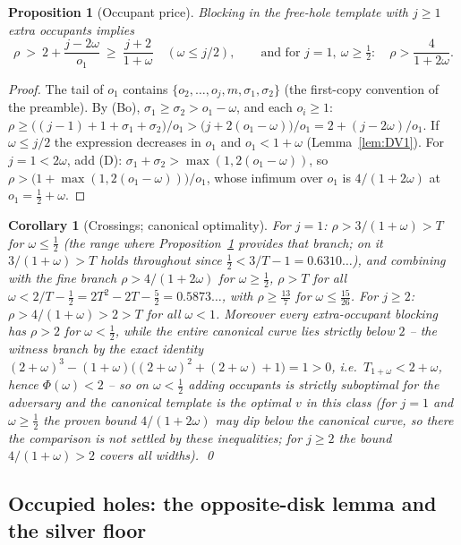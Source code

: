 \documentclass[11pt]{article}
\newtheorem{proposition}[theorem]{Proposition}
\newtheorem{corollary}[theorem]{Corollary}
\theoremstyle{definition}
\begin{document}
\begin{proposition}[Occupant price]\label{prop:DV2}
Blocking in the free-hole template with $j\ge1$ extra occupants implies
\[
\rho\ >\ 2+\frac{j-2\omega}{o_1}\ \ge\ \frac{j+2}{1+\omega}
\quad(\omega\le j/2),
\qquad\text{and for }j=1,\ \omega\ge\tfrac12:\quad
\rho>\frac{4}{1+2\omega}.
\]
\end{proposition}
\begin{proof}
The tail of $o_1$ contains $\{o_2,\dots,o_j,m,\sigma_1,\sigma_2\}$ (the
first-copy convention of the preamble). By (Bo), $\sigma_1\ge\sigma_2>o_1-\omega$,
and each $o_i\ge1$:
$\rho\ge\bigl((j-1)+1+\sigma_1+\sigma_2\bigr)/o_1
>\bigl(j+2(o_1-\omega)\bigr)/o_1=2+(j-2\omega)/o_1$. If $\omega\le j/2$
the expression decreases in $o_1$ and $o_1<1+\omega$
(Lemma~\ref{lem:DV1}). For $j=1<2\omega$, add (D):
$\sigma_1+\sigma_2>\max(1,2(o_1-\omega))$, so
$\rho>\bigl(1+\max(1,2(o_1-\omega))\bigr)/o_1$, whose infimum over $o_1$
is $4/(1+2\omega)$ at $o_1=\tfrac12+\omega$.
\end{proof}

\begin{corollary}[Crossings; canonical optimality]\label{cor:DV34}
For $j=1$: $\rho>3/(1+\omega)>T$ for
$\omega\le\tfrac12$ (the range where Proposition~\ref{prop:DV2}
provides that branch; on it $3/(1+\omega)>T$ holds throughout since
$\tfrac12<3/T-1=0.6310\dots$), and combining with the fine branch
$\rho>4/(1+2\omega)$ for $\omega\ge\tfrac12$,
$\rho>T$ for all $\omega<2/T-\tfrac12=2T^2-2T-\tfrac52=0.5873\dots$, with
$\rho\ge\tfrac{13}7$ for $\omega\le\tfrac{15}{26}$. For $j\ge2$:
$\rho>4/(1+\omega)>2>T$ for all $\omega<1$. Moreover every
extra-occupant blocking has $\rho>2$ for $\omega<\tfrac12$, while the
entire canonical curve lies strictly below $2$ -- the witness branch by
the exact identity
$(2+\omega)^3-(1+\omega)\bigl((2+\omega)^2+(2+\omega)+1\bigr)=1>0$, i.e.\
$T_{1+\omega}<2+\omega$, hence $\Phi(\omega)<2$ -- so on
$\omega<\tfrac12$ adding occupants is
strictly suboptimal for the adversary and the canonical template is
the optimal $v$ in this class (for $j=1$ and
$\omega\ge\tfrac12$ the proven bound $4/(1+2\omega)$ may dip below
the canonical curve, so there the comparison is not settled by
these inequalities; for $j\ge2$ the bound $4/(1+\omega)>2$ covers
all widths). \qed
\end{corollary}

\subsection{Occupied holes: the opposite-disk lemma and the silver floor}
\label{app:blockers-app}
\end{document}
